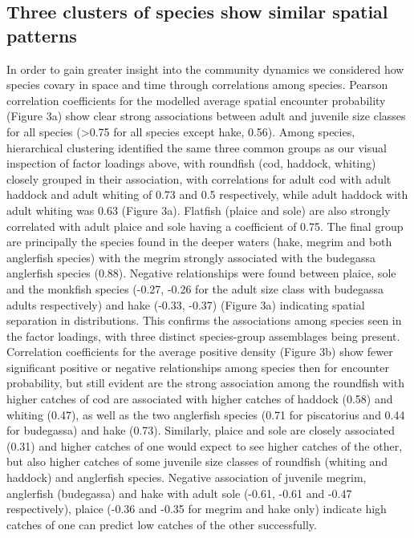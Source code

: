 \documentclass[fleqn,10pt]{wlscirep}
\begin{document}
\begin{linenumbers}
\subsection*{Three clusters of species show similar spatial patterns\\} In order to
gain greater insight into the community dynamics we considered how
species covary in space and time through correlations among species. 
Pearson correlation coefficients for the modelled average spatial
encounter probability (Figure 3a) show clear strong associations between adult
and juvenile size classes for all species (\textgreater 0.75 for all species
except hake, 0.56).  Among species, hierarchical clustering identified
the same three common groups as our visual inspection of factor loadings above,
with roundfish (cod, haddock, whiting) closely grouped in their association,
with correlations for adult cod with adult haddock and adult whiting of 0.73
and 0.5 respectively, while adult haddock with adult whiting was 0.63 (Figure
3a). Flatfish (plaice and sole) are also strongly correlated with adult plaice
and sole having a coefficient of 0.75.  The final group are principally the
species found in the deeper waters (hake, megrim and both anglerfish species)
with the megrim strongly associated with the budegassa anglerfish species
(0.88). Negative relationships were found between plaice, sole and the monkfish
species (-0.27, -0.26 for the adult size class with budegassa adults
respectively) and hake (-0.33, -0.37) (Figure 3a) indicating spatial separation
in distributions. This confirms the associations among species seen in the
factor loadings, with three distinct species-group assemblages being present.\\

Correlation coefficients for the average positive density (Figure 3b) show
fewer significant positive or negative relationships among species then
for encounter probability, but still evident are the strong association among
the roundfish with higher catches of cod are associated with higher catches of
haddock (0.58) and whiting (0.47), as well as the two anglerfish species (0.71
for piscatorius and 0.44 for budegassa) and hake (0.73). Similarly, plaice and
sole are closely associated (0.31) and higher catches of one would expect to
see higher catches of the other, but also higher catches of some juvenile size
classes of roundfish (whiting and haddock) and anglerfish species. Negative
association of juvenile megrim, anglerfish (budegassa) and hake with adult sole
(-0.61, -0.61 and -0.47 respectively), plaice (-0.36 and -0.35 for megrim and
hake only) indicate high catches of one can predict low catches of the other
successfully.\\


\end{linenumbers}
\end{document}
